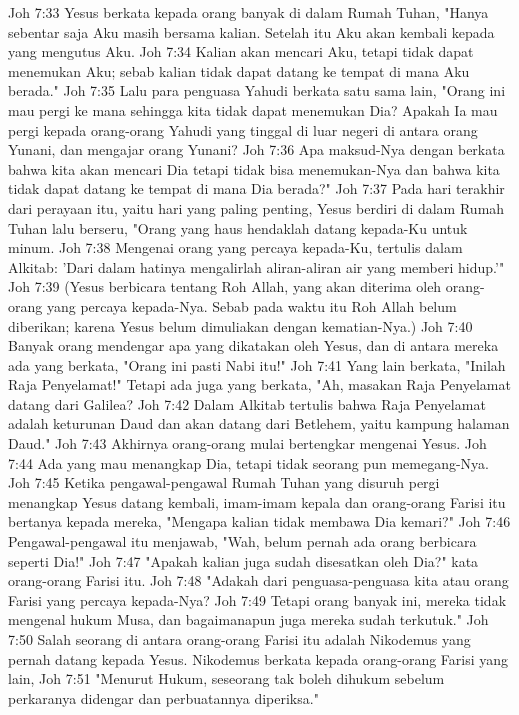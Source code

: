 Joh 7:33  Yesus berkata kepada orang banyak di dalam Rumah Tuhan, "Hanya sebentar saja Aku masih bersama kalian. Setelah itu Aku akan kembali kepada yang mengutus Aku.
Joh 7:34  Kalian akan mencari Aku, tetapi tidak dapat menemukan Aku; sebab kalian tidak dapat datang ke tempat di mana Aku berada."
Joh 7:35  Lalu para penguasa Yahudi berkata satu sama lain, "Orang ini mau pergi ke mana sehingga kita tidak dapat menemukan Dia? Apakah Ia mau pergi kepada orang-orang Yahudi yang tinggal di luar negeri di antara orang Yunani, dan mengajar orang Yunani?
Joh 7:36  Apa maksud-Nya dengan berkata bahwa kita akan mencari Dia tetapi tidak bisa menemukan-Nya dan bahwa kita tidak dapat datang ke tempat di mana Dia berada?"
Joh 7:37  Pada hari terakhir dari perayaan itu, yaitu hari yang paling penting, Yesus berdiri di dalam Rumah Tuhan lalu berseru, "Orang yang haus hendaklah datang kepada-Ku untuk minum.
Joh 7:38  Mengenai orang yang percaya kepada-Ku, tertulis dalam Alkitab: 'Dari dalam hatinya mengalirlah aliran-aliran air yang memberi hidup.'"
Joh 7:39  (Yesus berbicara tentang Roh Allah, yang akan diterima oleh orang-orang yang percaya kepada-Nya. Sebab pada waktu itu Roh Allah belum diberikan; karena Yesus belum dimuliakan dengan kematian-Nya.)
Joh 7:40  Banyak orang mendengar apa yang dikatakan oleh Yesus, dan di antara mereka ada yang berkata, "Orang ini pasti Nabi itu!"
Joh 7:41  Yang lain berkata, "Inilah Raja Penyelamat!" Tetapi ada juga yang berkata, "Ah, masakan Raja Penyelamat datang dari Galilea?
Joh 7:42  Dalam Alkitab tertulis bahwa Raja Penyelamat adalah keturunan Daud dan akan datang dari Betlehem, yaitu kampung halaman Daud."
Joh 7:43  Akhirnya orang-orang mulai bertengkar mengenai Yesus.
Joh 7:44  Ada yang mau menangkap Dia, tetapi tidak seorang pun memegang-Nya.
Joh 7:45  Ketika pengawal-pengawal Rumah Tuhan yang disuruh pergi menangkap Yesus datang kembali, imam-imam kepala dan orang-orang Farisi itu bertanya kepada mereka, "Mengapa kalian tidak membawa Dia kemari?"
Joh 7:46  Pengawal-pengawal itu menjawab, "Wah, belum pernah ada orang berbicara seperti Dia!"
Joh 7:47  "Apakah kalian juga sudah disesatkan oleh Dia?" kata orang-orang Farisi itu.
Joh 7:48  "Adakah dari penguasa-penguasa kita atau orang Farisi yang percaya kepada-Nya?
Joh 7:49  Tetapi orang banyak ini, mereka tidak mengenal hukum Musa, dan bagaimanapun juga mereka sudah terkutuk."
Joh 7:50  Salah seorang di antara orang-orang Farisi itu adalah Nikodemus yang pernah datang kepada Yesus. Nikodemus berkata kepada orang-orang Farisi yang lain,
Joh 7:51  "Menurut Hukum, seseorang tak boleh dihukum sebelum perkaranya didengar dan perbuatannya diperiksa."
